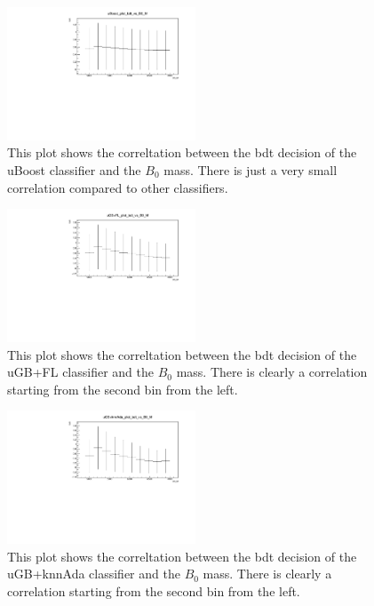 \documentclass[english]{uzhpub}
\begin{document}
\begin{figure}[H]
 \centering
 \includegraphics[width=0.5\textwidth]{plots/uBoost_plot_bdt_vs_B0_M}
 \caption{This plot shows the correltation between the bdt decision of the uBoost classifier and the $B_0$ mass. There is just a very small correlation compared to other classifiers.}
 \label{fig:uBoostB0M}
\end{figure}

\begin{figure}[H]
 \centering
 \includegraphics[width=0.5\textwidth]{plots/uGB+FL_plot_bdt_vs_B0_M}
 \caption{This plot shows the correltation between the bdt decision of the uGB+FL classifier and the $B_0$ mass. There is clearly a correlation starting from the second bin from the left.}
 \label{fig:uGB+FLB0M}
\end{figure}

\begin{figure}[H]
 \centering
 \includegraphics[width=0.5\textwidth]{plots/uGB+knnAda_plot_bdt_vs_B0_M}
 \caption{This plot shows the correltation between the bdt decision of the uGB+knnAda classifier and the $B_0$ mass. There is clearly a correlation starting from the second bin from the left.}
 \label{fig:uGB+knnAdaB0M}
\end{figure}
\end{document}
